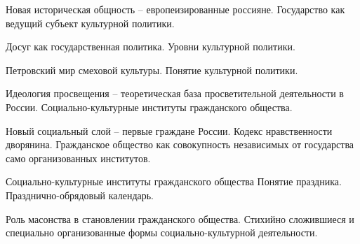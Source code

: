 \documentclass[
	14pt,
	a4paper,
	]
	{scrartcl}
\begin{document}
\vfill
\z Новая историческая общность – европеизированные россияне.
 \vfill
\z Государство как ведущий субъект культурной политики.
 \vfill

\vfill

\newpage


\shapk
{}
\setcounter{zad}{0}

\vfill
\z Досуг как государственная политика.
 \vfill
\z Уровни культурной политики.
 \vfill

\vfill

\newpage


\shapk
{}
\setcounter{zad}{0}

\vfill
\z Петровский мир смеховой культуры.
 \vfill
\z Понятие культурной политики.
 \vfill

\vfill

\newpage


\shapk
{}
\setcounter{zad}{0}

\vfill
\z Идеология просвещения – теоретическая база просветительной деятельности в России.
 \vfill
\z Социально-культурные институты гражданского общества.
 \vfill

\vfill

\newpage


\shapk
{}
\setcounter{zad}{0}

\vfill
\z Новый социальный слой – первые граждане России. Кодекс нравственности дворянина.
 \vfill
\z Гражданское общество как совокупность независимых от государства само организованных институтов.
 \vfill

\vfill

\newpage


\shapk
{}
\setcounter{zad}{0}

\vfill
\z Социально-культурные институты гражданского общества
 \vfill
\z Понятие праздника. Празднично-обрядовый календарь.
 \vfill

\vfill

\newpage


\shapk
{}
\setcounter{zad}{0}

\vfill
\z Роль масонства в становлении гражданского общества.
 \vfill
\z Стихийно сложившиеся и специально организованные формы социально-культурной деятельности.
 \vfill

\vfill

\newpage


\shapk
{}
\setcounter{zad}{0}
\end{document}

